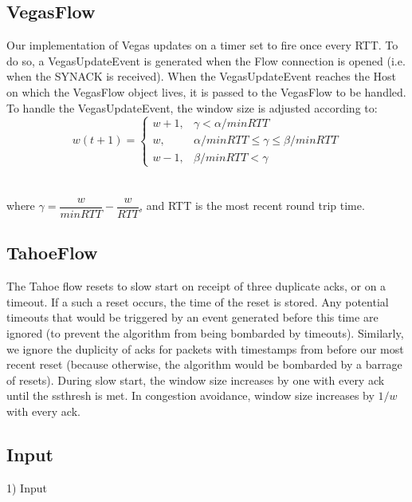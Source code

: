 \documentclass[12pt]{article}
\begin{document}
\subsection{VegasFlow}
Our implementation of Vegas updates on a timer set to fire once every RTT.  To do so, a VegasUpdateEvent is generated when the Flow connection is opened (i.e. when the SYNACK is received).  When the VegasUpdateEvent reaches the Host on which the VegasFlow object lives, it is passed to the VegasFlow to be handled.  To handle the VegasUpdateEvent, the window size is adjusted according to:
$$ w(t + 1) = \begin{cases} w + 1, & \gamma < \alpha / minRTT \\ w, & \alpha/minRTT \le \gamma \le \beta/minRTT \\ w - 1, & \beta / minRTT < \gamma \end{cases}$$
\\\\
where $\gamma = \dfrac{w}{minRTT} - \dfrac{w}{RTT}$, and RTT is the most recent round trip time.

\subsection{TahoeFlow}
The Tahoe flow resets to slow start on receipt of three duplicate acks, or on a timeout.  If a such a reset occurs, the time of the reset is stored.  Any potential timeouts that would be triggered by an event generated before this time are ignored (to prevent the algorithm from being bombarded by timeouts).  Similarly, we ignore the duplicity of acks for packets with timestamps from before our most recent reset (because otherwise, the algorithm would be bombarded by a barrage of resets).  During slow start, the window size increases by one with every ack until the ssthresh is met.  In congestion avoidance, window size increases by $1/w$ with every ack.

\subsection{Input}
1) Input
\end{document}
